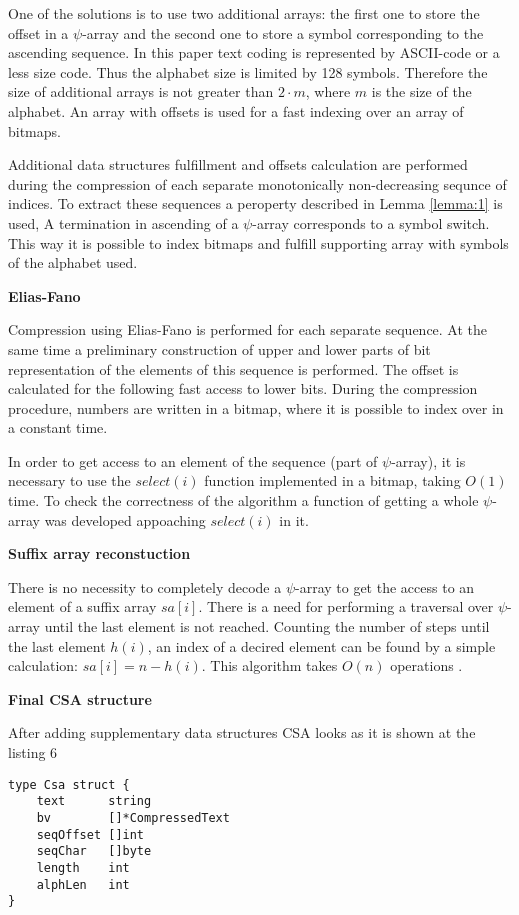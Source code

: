 One of the solutions is to use two additional arrays:
the first one to store the offset in a $\psi$-array and the second one to store a symbol
corresponding to the ascending sequence.
In this paper text coding is represented by ASCII-code or a less size code.
Thus the alphabet size is limited by 128 symbols. Therefore the size of additional arrays is not
greater than $2 \cdot m$, where $m$ is the size of the alphabet.
An array with offsets is used for a fast indexing over an array of bitmaps.

Additional data structures fulfillment and offsets calculation are performed during the compression
of each separate monotonically non-decreasing sequnce of indices.
To extract these sequences a peroperty described in Lemma \ref{lemma:1} is used,
A termination in ascending of a $\psi$-array corresponds to a symbol switch.
This way it is possible to index bitmaps and fulfill supporting array with symbols of the alphabet used.

\textbf{Elias-Fano}

Compression using Elias-Fano is performed for each separate sequence.
At the same time a preliminary construction of upper and lower parts of bit representation
of the elements of this sequence is performed. The offset is calculated for the following
fast access to lower bits. During the compression procedure, numbers are written in a bitmap,
where it is possible to index over in a constant time.

In order to get access to an element of the sequence (part of $\psi$-array), it is
necessary to use the $select(i)$ function implemented in a bitmap, taking $O(1)$ time.
To check the correctness of the algorithm a function of getting a whole $\psi$-array
was developed appoaching $select(i)$ in it.

\textbf{Suffix array reconstuction}

There is no necessity to completely decode a $\psi$-array to get the access to
an element of a suffix array $sa[i]$. There is a need for performing a traversal over $\psi$-array
until the last element is not reached. Counting the number of steps until the last element $h(i)$,
an index of a decired element can be found by a simple calculation: $sa[i] = n - h(i)$.
This algorithm takes $O(n)$ operations \cite{andersensimple}.

\textbf{Final CSA structure}

After adding supplementary data structures CSA looks as it is shown at the listing 6

\begin{lstlisting}[caption=CSA structure]
type Csa struct {
	text      string
	bv        []*CompressedText
	seqOffset []int
	seqChar   []byte
	length    int
	alphLen   int
}
\end{lstlisting}

